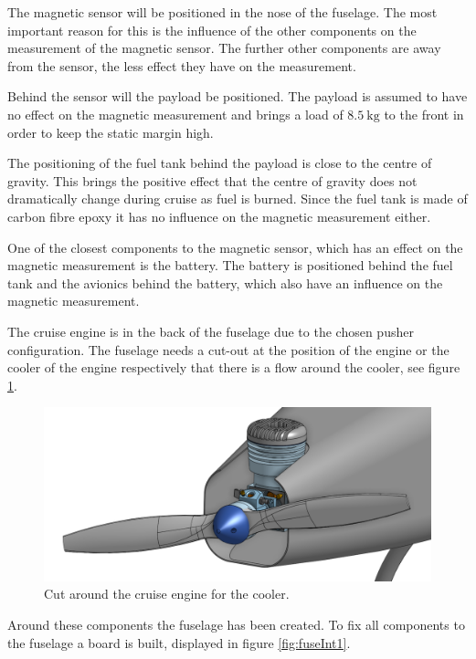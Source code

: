 \documentclass[english,fira]{ist-report}
\begin{document}
The magnetic sensor will be positioned in the nose of the fuselage. The most important reason for this is the influence of the other components on the measurement of the magnetic sensor. The further other components are away from the sensor, the less effect they have on the measurement.

Behind the sensor will the payload be positioned. The payload is assumed to have no effect on the magnetic measurement and brings a load of $8.5\ \mathrm{kg}$ to the front in order to keep the static margin high.

The positioning of the fuel tank behind the payload is close to the centre of gravity. This brings the positive effect that the centre of gravity does not dramatically change during cruise as fuel is burned. Since the fuel tank is made of carbon fibre epoxy it has no influence on the magnetic measurement either.

One of the closest components to the magnetic sensor, which has an effect on the magnetic measurement is the battery. The battery is positioned behind the fuel tank and the avionics behind the battery, which also have an influence on the magnetic measurement.

The cruise engine is in the back of the fuselage due to the chosen pusher configuration. The fuselage needs a cut-out at the position of the engine or the cooler of the engine respectively that there is a flow around the cooler, see figure \ref{fig:engineCruiseCut}.

\begin{figure}[ht]
	\centering
	\includegraphics[width = 1\linewidth]{graphics/cad/engineCruiseCut.png}
	\caption{Cut around the cruise engine for the cooler.}
	\label{fig:engineCruiseCut}
\end{figure}

Around these components the fuselage has been created. To fix all components to the fuselage a board is built, displayed in figure \ref{fig:fuseInt1}.
\end{document}
